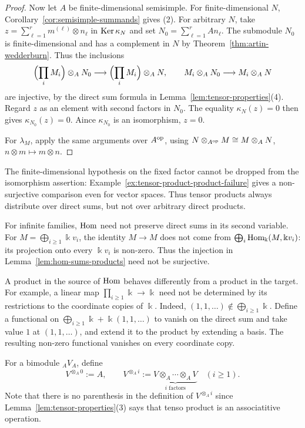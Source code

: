 \begin{advanced}
\begin{proof}
Now let $A$ be finite-dimensional semisimple.
For finite-dimensional $N$, Corollary~\ref{cor:semisimple-summands} gives (2).
For arbitrary $N$, take $z=\sum_{\ell=1}^r m^{(\ell)}\otimes n_\ell$ in $\operatorname{Ker}\nolimits\kappa_N$ and set $N_0=\sum_{\ell=1}^r An_\ell$.
The submodule $N_0$ is finite-dimensional and has a complement in $N$ by Theorem~\ref{thm:artin-wedderburn}.
Thus the inclusions
\[
\Bigl(\prod_iM_i\Bigr)\otimes_A N_0
\longrightarrow\Bigl(\prod_iM_i\Bigr)\otimes_A N,
\qquad
M_i\otimes_A N_0\longrightarrow M_i\otimes_A N
\]
are injective, by the direct sum formula in Lemma~\ref{lem:tensor-properties}(4).
Regard $z$ as an element with second factors in $N_0$.
The equality $\kappa_N(z)=0$ then gives $\kappa_{N_0}(z)=0$.
Aince $\kappa_{N_0}$ is an isomorphism, $z=0$.

For $\lambda_M$, apply the same arguments over $A^{\mathrm{op}}$, using
$N\otimes_{A^{\mathrm{op}}}M\cong M\otimes_A N$, $n\otimes m\mapsto m\otimes n$.
\end{proof}

The finite-dimensional hypothesis on the fixed factor cannot be dropped from the isomorphism assertion: Example~\ref{ex:tensor-product-product-failure} gives a non-surjective comparison even for vector spaces.
Thus tensor products always distribute over direct sums, but not over arbitrary direct products.

\begin{remark}\label{rem:infinite-products}
For infinite families, $\operatorname{Hom}\nolimits$ need not preserve direct sums in its second variable.
For $M=\bigoplus_{i\geq1}\Bbbk v_i$, the identity $M\to M$ does not come from $\bigoplus_i\operatorname{Hom}\nolimits_\Bbbk(M,\Bbbk v_i)$: its projection onto every $\Bbbk v_i$ is non-zero.
Thus the injection in Lemma~\ref{lem:hom-sums-products} need not be surjective.

A product in the source of $\operatorname{Hom}\nolimits$ behaves differently from a product in the target.
For example, a linear map $\prod_{i\geq1}\Bbbk\to\Bbbk$ need not be determined by its restrictions to the coordinate copies of $\Bbbk$.
Indeed, $(1,1,\ldots)\notin\bigoplus_{i\geq1}\Bbbk$.
Define a functional on $\bigoplus_{i\geq1}\Bbbk+\Bbbk(1,1,\ldots)$ to vanish on the direct sum and take value $1$ at $(1,1,\ldots)$, and extend it to the product by extending a basis.
The resulting non-zero functional vanishes on every coordinate copy.
\end{remark}
\end{advanced}



\label{not:tensor-powers}
For a bimodule ${}_AV_A$, define
\[
V^{\otimes_A 0}:=A,\qquad
V^{\otimes_A i}:=
\underbrace{V\otimes_A\cdots\otimes_A V}_{i\text{ factors}}
\quad(i\geq1).
\]
Note that there is no parenthesis in the definition of $V^{\otimes_A i}$ since Lemma~\ref{lem:tensor-properties}(3) says that tenso product is an associatitive operation.

